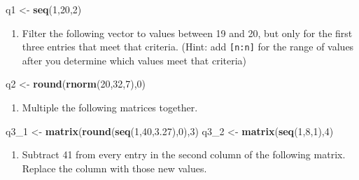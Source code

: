 \documentclass[
]{book}
\newenvironment{Shaded}{\begin{snugshade}}{\end{snugshade}}
\newcommand{\DecValTok}[1]{\textcolor[rgb]{0.00,0.00,0.81}{#1}}
\newcommand{\FloatTok}[1]{\textcolor[rgb]{0.00,0.00,0.81}{#1}}
\newcommand{\KeywordTok}[1]{\textcolor[rgb]{0.13,0.29,0.53}{\textbf{#1}}}
\newcommand{\NormalTok}[1]{#1}
\newcommand{\StringTok}[1]{\textcolor[rgb]{0.31,0.60,0.02}{#1}}
\providecommand{\tightlist}{%
  \setlength{\itemsep}{0pt}\setlength{\parskip}{0pt}}
\begin{document}
\begin{center}
\begin{Shaded}
\begin{Highlighting}[]
\NormalTok{q1 <-}\StringTok{ }\KeywordTok{seq}\NormalTok{(}\DecValTok{1}\NormalTok{,}\DecValTok{20}\NormalTok{,}\DecValTok{2}\NormalTok{)}
\end{Highlighting}
\end{Shaded}

\begin{enumerate}
\def\labelenumi{\arabic{enumi}.}
\setcounter{enumi}{1}
\tightlist
\item
  Filter the following vector to values between 19 and 20, but only for the first three entries that meet that criteria. (Hint: add \texttt{{[}n:n{]}} for the range of values after you determine which values meet that criteria)
\end{enumerate}

\begin{Shaded}
\begin{Highlighting}[]
\NormalTok{q2 <-}\StringTok{ }\KeywordTok{round}\NormalTok{(}\KeywordTok{rnorm}\NormalTok{(}\DecValTok{20}\NormalTok{,}\DecValTok{32}\NormalTok{,}\DecValTok{7}\NormalTok{),}\DecValTok{0}\NormalTok{)}
\end{Highlighting}
\end{Shaded}

\begin{enumerate}
\def\labelenumi{\arabic{enumi}.}
\setcounter{enumi}{2}
\tightlist
\item
  Multiple the following matrices together.
\end{enumerate}

\begin{Shaded}
\begin{Highlighting}[]
\NormalTok{q3_}\DecValTok{1}\NormalTok{ <-}\StringTok{ }\KeywordTok{matrix}\NormalTok{(}\KeywordTok{round}\NormalTok{(}\KeywordTok{seq}\NormalTok{(}\DecValTok{1}\NormalTok{,}\DecValTok{40}\NormalTok{,}\FloatTok{3.27}\NormalTok{),}\DecValTok{0}\NormalTok{),}\DecValTok{3}\NormalTok{)}
\NormalTok{q3_}\DecValTok{2}\NormalTok{ <-}\StringTok{ }\KeywordTok{matrix}\NormalTok{(}\KeywordTok{seq}\NormalTok{(}\DecValTok{1}\NormalTok{,}\DecValTok{8}\NormalTok{,}\DecValTok{1}\NormalTok{),}\DecValTok{4}\NormalTok{)}
\end{Highlighting}
\end{Shaded}

\begin{enumerate}
\def\labelenumi{\arabic{enumi}.}
\setcounter{enumi}{3}
\tightlist
\item
  Subtract 41 from every entry in the second column of the following matrix. Replace the column with those new values.
\end{enumerate}


\end{center}
\end{document}
